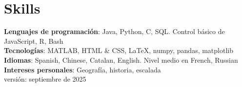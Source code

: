 \documentclass[11pt,a4paper]{article}
\begin{document}
\section*{Skills}
\textbf{Lenguajes de programación}: Java, Python, C, SQL.  Control básico de JavaScript, R, Bash \\[2pt]
\textbf{Tecnologías}: MATLAB, HTML \& CSS, \LaTeX, numpy, pandas, matplotlib \\[2pt]
\textbf{Idiomas}: Spanish, Chinese, Catalan, English. Nivel medio en French, Russian \\[2pt]
\textbf{Intereses personales}: Geografía, historia, escalada \\[5pt]

    

    


\vfill
\noindent
\small versión: septiembre de 2025
\end{document}
